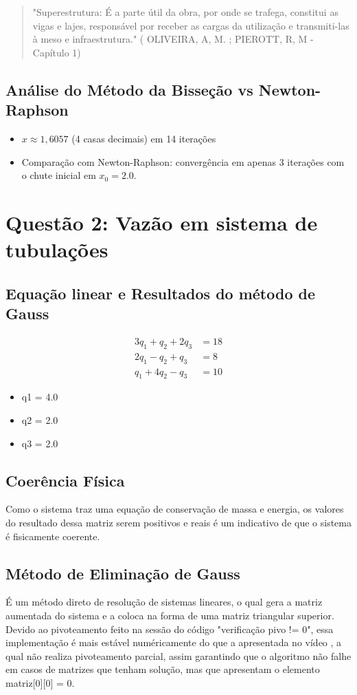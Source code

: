 \documentclass{article}
\begin{document}
\begin{quote}
"Superestrutura: É a parte útil da obra, por onde se trafega, constitui as vigas e lajes, responsável por receber as cargas da utilização e transmiti-las à meso e infraestrutura." ( OLIVEIRA, A, M. ; PIEROTT, R, M - Capítulo 1) \cite{oliveira2016}
\end{quote}

\subsection*{Análise do Método da Bisseção vs Newton-Raphson}
\begin{itemize}
\item $x \approx 1,\!6057$ (4 casas decimais) em 14 iterações 
\item Comparação com Newton-Raphson: convergência em apenas 3 iterações com o chute inicial em $x_0 = 2.0$.
\end{itemize}






\section*{Questão 2: Vazão em sistema de tubulações}
\subsection*{Equação linear e Resultados do método de Gauss}
\begin{align*}
3q_1 + q_2 + 2q_3 &= 18 \\
2q_1 - q_2 + q_3 &= 8 \\
q_1 + 4q_2 - q_3 &= 10
\end{align*}

\begin{itemize}
\item q1 = 4.0
\item q2 = 2.0
\item q3 = 2.0
\end{itemize}


\subsection*{Coerência Física}
Como o sistema traz uma equação de conservação de massa e energia, os valores do resultado dessa matriz serem positivos e reais é um indicativo de que o sistema é fisicamente coerente.

\subsection*{Método de Eliminação de Gauss}
É um método direto de resolução de sistemas lineares, o qual gera a matriz aumentada do sistema e a coloca na forma de uma matriz triangular superior. Devido ao pivoteamento feito na sessão do código "verificação pivo != 0", essa implementação é mais estável numéricamente do que a apresentada no vídeo \cite{Gauss}, a qual não realiza 
pivoteamento parcial, assim garantindo que o algoritmo não falhe em casos de matrizes que tenham solução, mas que apresentam o elemento matriz[0][0] = 0.
\end{document}
